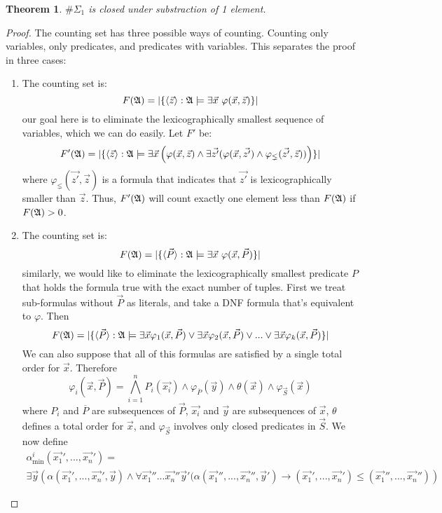 \documentclass[12pt]{article}
\def\A{{\frak A}}
\newtheorem{theo}{Theorem}
\begin{document}
\begin{theo}
$\#\Sigma_1$ is closed under substraction of 1 element.
\end{theo}
\begin{proof}
The counting set has three possible ways of counting. Counting only variables, only predicates, and predicates with variables. This separates the proof in three cases:
\begin{enumerate}
\item The counting set is:
$$
F(\A) = \vert \{ \langle\vec{z}\rangle :\A \models \exists \vec{x} \ \varphi(\vec{x},\vec{z}) \} \vert
$$
our goal here is to eliminate the lexicographically smallest sequence of variables, which we can do easily. Let $F'$ be:
$$
F'(\A) = \vert \{ \langle\vec{z}\rangle :\A \models \exists \vec{x}\left( \varphi(\vec{x},\vec{z}) \wedge \exists \vec{z'} (\varphi(\vec{x},\vec{z'}) \wedge \varphi_{\lneq}(\vec{z'},\vec{z} ) ) \right) \} \vert
$$
where $\varphi_{\lneq}(\vec{z'},\vec{z})$ is a formula that indicates that $\vec{z'}$ is lexicographically smaller than $\vec{z}$. Thus, $F'(\A)$ will count exactly one element less than $F(\A)$ if $F(\A)>0$.
\item The counting set is:
$$
F(\A) = \vert \{ \langle\vec{P}\rangle :\A \models \exists \vec{x} \ \varphi(\vec{x},\vec{P}) \} \vert
$$
similarly, we would like to eliminate the lexicographically smallest predicate $P$ that holds the formula true with the exact number of tuples. First we treat sub-formulas without $\vec{P}$ as literals, and take a DNF formula that's equivalent to $\varphi$. Then
$$
F(\A) = \vert \{ \langle\vec{P}\rangle :\A \models 
\exists \vec{x} \varphi_1(\vec{x},\vec{P}) \vee
\exists \vec{x} \varphi_2(\vec{x},\vec{P}) \vee
... \vee
\exists \vec{x} \varphi_k(\vec{x},\vec{P})
 \} \vert
$$
We can also suppose that all of this formulas are satisfied by a single total order for $\vec{x}$. Therefore
$$
\varphi_i(\vec{x},\vec{P}) = \bigwedge_{i=1}^n P_i(\vec{x_i}) \wedge \varphi_{\overline{P}}(\vec{y}) \wedge \theta(\vec{x}) \wedge \varphi_{\vec{S}}(\vec{x})
$$
where $P_i$ and $\overline{P}$ are subsequences of $\vec{P}$, $\vec{x_i}$ and $\vec{y}$ are subsequences of $\vec{x}$, $\theta$ defines a total order for $\vec{x}$, and $\varphi_{\vec{S}}$ involves only closed predicates in $\vec{S}$. We now define
\begin{multline*}
\alpha_{\min}^i(\vec{x_1}',...,\vec{x_n}') = \\ \exists\vec{y}\left( \alpha(\vec{x_1}',...,\vec{x_n}',\vec{y})\wedge \forall\vec{x_1}''...\vec{x_n}''\vec{y}'(\alpha(\vec{x_1}'',...,\vec{x_n}'',\vec{y}')\rightarrow (\vec{x_1}',...,\vec{x_n}') \leq (\vec{x_1}'',...,\vec{x_n}'')\right)

\end{multline*}
\end{enumerate}
\end{proof}
\end{document}
